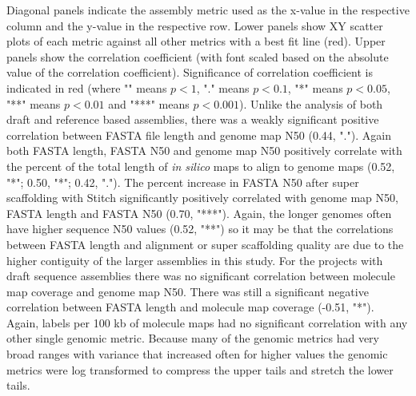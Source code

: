Diagonal panels indicate the assembly metric used as the x-value in the respective column and the y-value in the respective row. Lower panels show XY scatter plots of each metric against all other metrics with a best fit line (red). Upper panels show the correlation coefficient (with font scaled based on the absolute value of the correlation coefficient). Significance of correlation coefficient is indicated in red (where "" means $p< 1$, "." means $p< 0.1$, "*" means $p< 0.05$, "**" means $p< 0.01$ and "***" means $p< 0.001$).
Unlike the analysis of both draft and reference based assemblies, there was a weakly significant positive correlation between FASTA file length and genome map N50 (0.44, "."). 
Again both FASTA length, FASTA N50 and genome map N50 positively correlate with the percent of the total length of \textit{in silico} maps to align to genome maps (0.52, "*"; 0.50, "*"; 0.42, "."). 
The percent increase in FASTA N50 after super scaffolding with Stitch significantly positively correlated with genome map N50, FASTA length and FASTA N50 (0.70, "***").
Again, the longer genomes often have higher sequence N50 values (0.52, "**") so it may be that the correlations between FASTA length and alignment or super scaffolding quality are due to the higher contiguity of the larger assemblies in this study.
For the projects with draft sequence assemblies there was no significant correlation between molecule map coverage and genome map N50. There was still a significant negative correlation between FASTA length and molecule map coverage (-0.51, "*").
Again, labels per 100 kb of molecule maps had no significant correlation with any other single genomic metric.
Because many of the genomic metrics had very broad ranges with variance that increased often for higher values the genomic metrics were log transformed to compress the upper tails and stretch the lower tails.